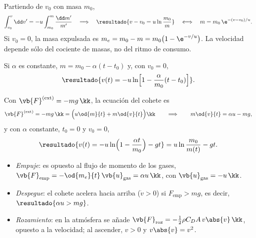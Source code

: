 \begin{corolario}[Tsiolkovski]
\label{cor:tsiolkovski}
Partiendo de $v_{0}$ con masa $m_{0}$,
\begin{equation}
  \int_{v_{0}}^{v}\dd v'=-u\int_{m_{0}}^{m}\frac{\dd m'}{m'}
  \quad\Longrightarrow\quad
  \resultado{v-v_{0}=u\ln\frac{m_{0}}{m}}
  \quad\Longleftrightarrow\quad
  m=m_{0}\,\e^{-(v-v_{0})/u} .
  \label{eq:tsiolkovski}
\end{equation}
Si $v_{0}=0$, la masa expulsada es $m_{e}=m_{0}-m=m_{0}\bigl(1-\e^{-v/u}\bigr)$. La velocidad depende
sólo del cociente de masas, no del ritmo de consumo.
\end{corolario}

\begin{corolario}
\label{cor:cohete-alfa}
Si $\alpha$ es constante, $m=m_{0}-\alpha(t-t_{0})$ y, con $v_{0}=0$,
\begin{equation}
  \resultado{v(t)=-u\ln\Bigl[1-\frac{\alpha}{m_{0}}(t-t_{0})\Bigr]} .
\end{equation}
\end{corolario}

\begin{proposicion}
\label{prop:cohete-g}
Con $\vb{F}\ext=-mg\,\kk$, la ecuación del cohete es
\begin{equation}
  \vb{F}\ext=-mg\,\kk=\Bigl(u\od{m}{t}+m\od{v}{t}\Bigr)\kk
  \qquad\Longrightarrow\qquad
  m\od{v}{t}=\alpha u-mg ,
\end{equation}
y con $\alpha$ constante, $t_{0}=0$ y $v_{0}=0$,
\begin{equation}
  \resultado{v(t)=-u\ln\Bigl(1-\frac{\alpha t}{m_{0}}\Bigr)-gt}=u\ln\frac{m_{0}}{m(t)}-gt .
\end{equation}
\begin{itemize}
  \item \emph{Empuje}: es opuesto al flujo de momento de los gases,
        $\vb{F}_{\text{emp}}=-\od{m_{e}}{t}\,\vb{u}_{\text{gas}}=\alpha u\,\kk$, con $\vb{u}_{\text{gas}}=-u\,\kk$.
  \item \emph{Despegue}: el cohete acelera hacia arriba ($\dot v>0$) si
        $F_{\text{emp}}>mg$, es decir, $\resultado{\alpha u>mg}$.
  \item \emph{Rozamiento}: en la atmósfera se añade
        $\vb{F}_{\text{roz}}=-\tfrac12\rho C_{D}A\,v\abs{v}\,\kk$, opuesto a la velocidad; al ascender,
        $v>0$ y $v\abs{v}=v^{2}$.
\end{itemize}
\end{proposicion}

